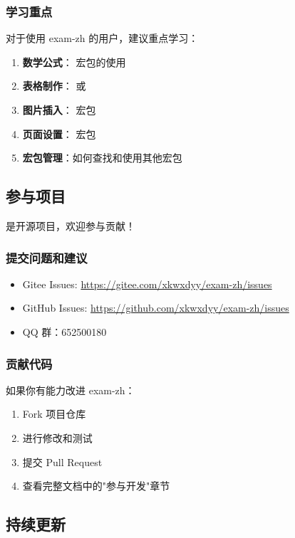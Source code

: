 \subsubsection{学习重点}

对于使用 exam-zh 的用户，建议重点学习：

\begin{enumerate}
  \item \textbf{数学公式}： 宏包的使用
  \item \textbf{表格制作}： 或 
  \item \textbf{图片插入}： 宏包
  \item \textbf{页面设置}： 宏包
  \item \textbf{宏包管理}：如何查找和使用其他宏包
\end{enumerate}


\subsection{参与项目}

 是开源项目，欢迎参与贡献！

\subsubsection{提交问题和建议}

\begin{itemize}
  \item Gitee Issues: \url{https://gitee.com/xkwxdyy/exam-zh/issues}
  \item GitHub Issues: \url{https://github.com/xkwxdyy/exam-zh/issues}
  \item QQ 群：652500180
\end{itemize}

\subsubsection{贡献代码}

如果你有能力改进 exam-zh：
\begin{enumerate}
  \item Fork 项目仓库
  \item 进行修改和测试
  \item 提交 Pull Request
  \item 查看完整文档中的"参与开发"章节
\end{enumerate}


\subsection{持续更新}


